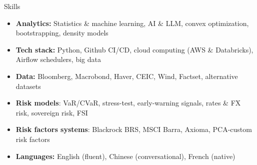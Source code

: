 \documentclass[usegeometry, 10pt, a4paper]{cv} %
\begin{document}
\newpage


\begin{rubriquetableau}[0.98\textwidth]{Skills}
  \vspace{-0.5cm}  
  \begin{itemize}
    \item \textbf{Analytics:} Statistics \& machine learning, AI \& LLM, convex optimization, bootstrapping, density models 
    \item \textbf{Tech stack:} Python, Github CI/CD, cloud computing (AWS \& Databricks), Airflow schedulers, big data 
    \item \textbf{Data:} Bloomberg, Macrobond, Haver, CEIC, Wind, Factset, alternative datasets
    \item \textbf{Risk models}: VaR/CVaR, stress-test, early-warning signals, rates \& FX risk, sovereign risk, FSI 
    \item \textbf{Risk factors systems}: Blackrock BRS, MSCI Barra, Axioma, PCA-custom risk factors
    \item \textbf{Languages:} English (fluent), Chinese (conversational), French (native) 
  \end{itemize}
  \end{rubriquetableau}


\end{document}
